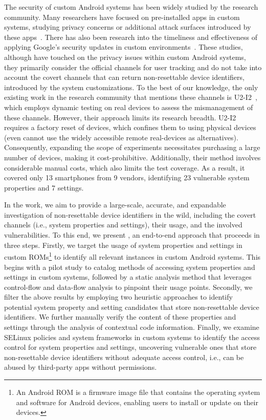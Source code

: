 The security of custom Android systems has been widely studied by the research community.
Many researchers have focused on pre-installed apps in custom systems, studying privacy concerns or additional attack surfaces introduced by these apps~\cite{blazquez2021trouble, gamba2020analysis, elsabagh2020firmscope}.
There has also been research into the timeliness and effectiveness of applying Google's security updates in custom environments~\cite{hou2022large, liu2022customized, el2021dissecting}.
These studies, although have touched on the privacy issues within custom Android systems, they primarily consider the official channels for user tracking and do not take into account the covert channels that can return non-resettable device identifiers, introduced by the system customizations.
To the best of our knowledge, the only existing work in the research community that mentions these channels is U2-I2~\cite{meng2023post}, which employs dynamic testing on real devices to assess the mismanagement of these channels. 
However, their approach limits its research breadth.
U2-I2 requires a factory reset of devices, which confines them to using physical devices (even cannot use the widely accessible remote real-devices as alternatives). 
Consequently, expanding the scope of experiments necessitates purchasing a large number of devices, making it cost-prohibitive. 
Additionally, their method involves considerable manual costs, which also limits the test coverage.
As a result, it covered only 13 smartphones from 9 vendors, identifying 23 vulnerable system properties and 7 settings. 

In the work, we aim to provide a large-scale, accurate, and expandable investigation of non-resettable device identifiers in the wild, including the covert channels (i.e., system properties and settings), their usage, and the involved vulnerabilities.
To this end, we present {\framework}, an end-to-end approach that proceeds in three steps.
Firstly, 
we target the usage of system properties and settings in custom ROMs\footnote{An Android ROM is a firmware image file that contains the operating system and software for Android devices, enabling users to install or update on their devices.}
to identify all relevant instances in custom Android systems.
This begins with a pilot study to catalog methods of accessing system properties and settings in custom systems, followed by a static analysis method that leverages control-flow and data-flow analysis to pinpoint their usage points.
Secondly, we filter the above results by employing two heuristic approaches to identify potential system property and setting candidates that store non-resettable device identifiers.
We further manually verify the content of these properties and settings through the analysis of contextual code information.
Finally, we examine SELinux policies and system frameworks in custom systems to identify the access control for system properties and settings, uncovering vulnerable ones that store non-resettable device identifiers without adequate access control, i.e., can be abused by third-party apps without permissions.

